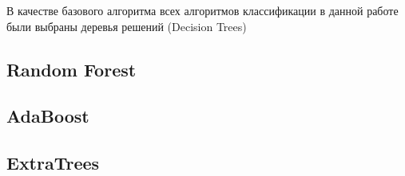 В качестве базового алгоритма всех алгоритмов классификации в данной работе были выбраны деревья решений 
(Decision Trees)


\subsection{Random Forest}\label{random_forest}

 

\subsection{AdaBoost}


\subsection{ExtraTrees}
